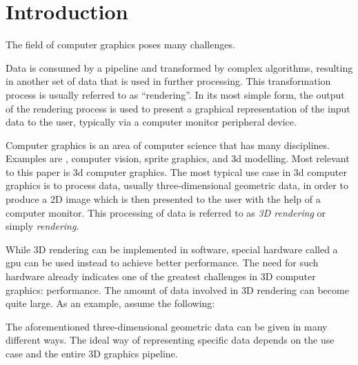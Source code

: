 
\chapter{Introduction}
\label{cha:Introduction}

  The field of computer graphics poses many challenges.

  Data is consumed by a pipeline and transformed by complex algorithms, resulting in another set of data that is used in further processing. This transformation process is usually referred to as ``rendering''. In its most simple form, the output of the rendering process is used to present a graphical representation of the input data to the user, typically via a computer monitor peripheral device.

  Computer graphics is an area of computer science that has many disciplines. Examples are , computer vision, sprite graphics, and \acrshort{3d} modelling. Most relevant to this paper is \acrfull{3d} computer graphics.  The most typical use case in \acrshort{3d} computer graphics is to process data, usually three-dimensional geometric data, in order to produce a 2D image which is then presented to the user with the help of a computer monitor. This processing of data is referred to as \textit{3D rendering} or simply \textit{rendering}.

  While 3D rendering can be implemented in software, special hardware called a \acrfull{gpu} can be used instead to achieve better performance. The need for such hardware already indicates one of the greatest challenges in 3D computer graphics: performance. The amount of data involved in 3D rendering can become quite large. As an example, assume the following:


  The aforementioned three-dimensional geometric data can be given in many different ways. The ideal way of representing specific data depends on the use case and the entire 3D graphics pipeline.

